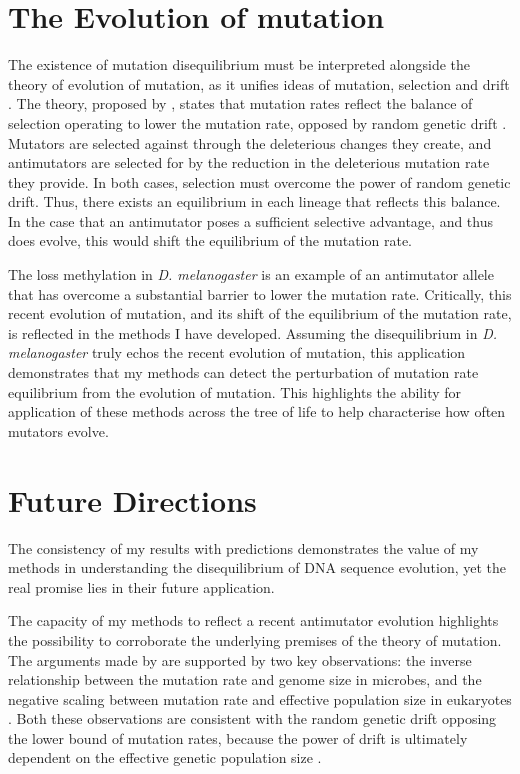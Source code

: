 \section{The Evolution of mutation}

The existence of mutation disequilibrium must be interpreted alongside the theory of evolution of mutation, as it unifies ideas of mutation, selection and drift \citep{Lynch2008TheEvolution, Lynch2010EvolutionRate}. The theory, proposed by \cite{Lynch2008TheEvolution}, states that mutation rates reflect the balance of selection operating to lower the mutation rate, opposed by random genetic drift \citep{Lynch2010EvolutionRate}. Mutators are selected against through the deleterious changes they create, and antimutators are selected for by the reduction in the deleterious mutation rate they provide. In both cases, selection must overcome the power of random genetic drift. Thus, there exists an equilibrium in each lineage that reflects this balance. In the case that an antimutator poses a sufficient selective advantage, and thus does evolve, this would shift the equilibrium of the mutation rate. 

The loss methylation in \textit{D. melanogaster} is an example of an antimutator allele that has overcome a substantial barrier to lower the mutation rate. Critically, this recent evolution of mutation, and its shift of the equilibrium of the mutation rate, is reflected in the methods I have developed. Assuming the disequilibrium in \textit{D. melanogaster} truly echos the recent evolution of mutation, this application demonstrates that my methods can detect the perturbation of mutation rate equilibrium from the evolution of mutation. This highlights the ability for application of these methods across the tree of life to help characterise how often mutators evolve. 

\section{Future Directions}

The consistency of my results with predictions demonstrates the value of my methods in understanding the disequilibrium of DNA sequence evolution, yet the real promise lies in their future application.

The capacity of my methods to reflect a recent antimutator evolution highlights the possibility to corroborate the underlying premises of the theory of mutation. The arguments made by \cite{Lynch2008TheEvolution, Lynch2010EvolutionRate} are supported by two key observations: the inverse relationship between the mutation rate and genome size in microbes, and the negative scaling between mutation rate and effective population size in eukaryotes \citep{Lynch2008TheEvolution, Lynch2010EvolutionRate}. Both these observations are consistent with the random genetic drift opposing the lower bound of mutation rates, because the power of drift is ultimately dependent on the effective genetic population size \citep{Lynch2008TheEvolution, Lynch2010EvolutionRate}. 

